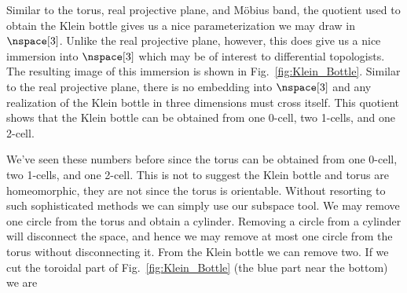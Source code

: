 \documentclass{book}                                                           %
\begin{document}
            \par\vspace{2.5ex}
            \begin{minipage}[t]{0.54\textwidth}
                Similar to the torus, real projective plane, and M\"{o}bius
                band, the quotient used to obtain the Klein bottle gives us a
                nice parameterization we may draw in $\nspace[3]$. Unlike the
                real projective plane, however, this does give us a nice
                immersion into $\nspace[3]$ which may be of interest to
                differential topologists. The resulting image of this immersion
                is shown in Fig.~\ref{fig:Klein_Bottle}. Similar to the real
                projective plane, there is no embedding into $\nspace[3]$ and
                any realization of the Klein bottle in three dimensions must
                cross itself. This quotient shows that the Klein bottle can be
                obtained from one 0-cell, two 1-cells, and one 2-cell.
            \end{minipage}
            \hfill
            \par\vspace{2.5ex}
            We've seen these numbers before since the torus can be obtained from
            one 0-cell, two 1-cells, and one 2-cell. This is not to suggest the
            Klein bottle and torus are homeomorphic, they are not since the
            torus is orientable. Without resorting to such sophisticated methods
            we can simply use our subspace tool. We may remove one circle from
            the torus and obtain a cylinder. Removing a circle from a cylinder
            will disconnect the space, and hence we may remove at most one
            circle from the torus without disconnecting it. From the Klein
            bottle we can remove two. If we cut the toroidal part of
            Fig.~\ref{fig:Klein_Bottle} (the blue part near the bottom) we are
\end{document}

